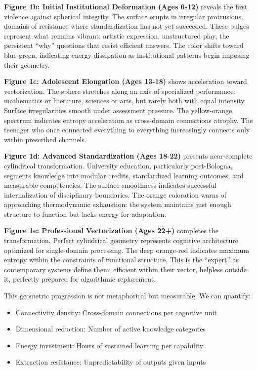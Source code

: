 \textbf{Figure 1b: Initial Institutional Deformation (Ages 6-12)} reveals the first violence against spherical integrity. The surface erupts in irregular protrusions, domains of resistance where standardization has not yet succeeded. These bulges represent what remains vibrant: artistic expression, unstructured play, the persistent ``why'' questions that resist efficient answers. The color shifts toward blue-green, indicating energy dissipation as institutional patterns begin imposing their geometry.

\textbf{Figure 1c: Adolescent Elongation (Ages 13-18)} shows acceleration toward vectorization. The sphere stretches along an axis of specialized performance: mathematics or literature, sciences or arts, but rarely both with equal intensity. Surface irregularities smooth under assessment pressure. The yellow-orange spectrum indicates entropy acceleration as cross-domain connections atrophy. The teenager who once connected everything to everything increasingly connects only within prescribed channels.

\textbf{Figure 1d: Advanced Standardization (Ages 18-22)} presents near-complete cylindrical transformation. University education, particularly post-Bologna, segments knowledge into modular credits, standardized learning outcomes, and measurable competencies. The surface smoothness indicates successful internalization of disciplinary boundaries. The orange coloration warns of approaching thermodynamic exhaustion: the system maintains just enough structure to function but lacks energy for adaptation.

\textbf{Figure 1e: Professional Vectorization (Ages 22+)} completes the transformation. Perfect cylindrical geometry represents cognitive architecture optimized for single-domain processing. The deep orange-red indicates maximum entropy within the constraints of functional structure. This is the ``expert'' as contemporary systems define them: efficient within their vector, helpless outside it, perfectly prepared for algorithmic replacement.

This geometric progression is not metaphorical but measurable. We can quantify:
\begin{itemize}
\item Connectivity density: Cross-domain connections per cognitive unit
\item Dimensional reduction: Number of active knowledge categories
\item Energy investment: Hours of sustained learning per capability
\item Extraction resistance: Unpredictability of outputs given inputs
\end{itemize}

